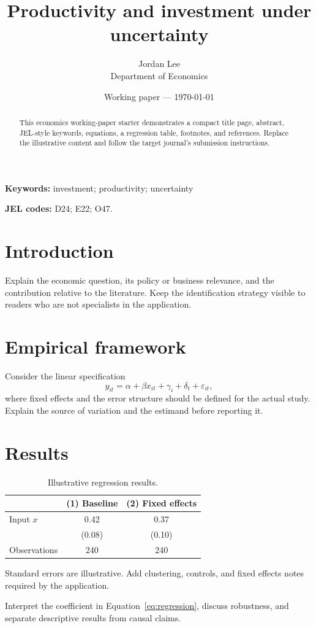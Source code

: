 \documentclass[11pt]{article}
\title{Productivity and investment under uncertainty}
\author{Jordan Lee\\\small Department of Economics}
\date{Working paper --- \today}
\newcommand{\keywords}[1]{\par\noindent\textbf{Keywords:} #1\par}
\begin{document}
\maketitle
\begin{abstract}
This economics working-paper starter demonstrates a compact title page,
abstract, JEL-style keywords, equations, a regression table, footnotes, and
references. Replace the illustrative content and follow the target journal's
submission instructions.
\end{abstract}
\keywords{investment; productivity; uncertainty}
\noindent\textbf{JEL codes:} D24; E22; O47.
\section{Introduction}
Explain the economic question, its policy or business relevance, and the
contribution relative to the literature. Keep the identification strategy
visible to readers who are not specialists in the application.
\section{Empirical framework}
Consider the linear specification
\begin{equation}
 y_{it} = \alpha + \beta x_{it} + \gamma_i + \delta_t + \varepsilon_{it},
 \label{eq:regression}
\end{equation}
where fixed effects and the error structure should be defined for the actual
study. Explain the source of variation and the estimand before reporting it.
\section{Results}
\begin{table}[ht]
\centering
\caption{Illustrative regression results.}
\begin{threeparttable}
\begin{tabular}{lcc}
\toprule
 & (1) Baseline & (2) Fixed effects \\
\midrule
Input $x$ & 0.42 & 0.37 \\
 & (0.08) & (0.10) \\
Observations & 240 & 240 \\
\bottomrule
\end{tabular}
\begin{tablenotes}\small
\item Standard errors are illustrative. Add clustering, controls, and fixed
effects notes required by the application.
\end{tablenotes}
\end{threeparttable}
\end{table}
Interpret the coefficient in Equation~\eqref{eq:regression}, discuss robustness,
and separate descriptive results from causal claims.
\end{document}
